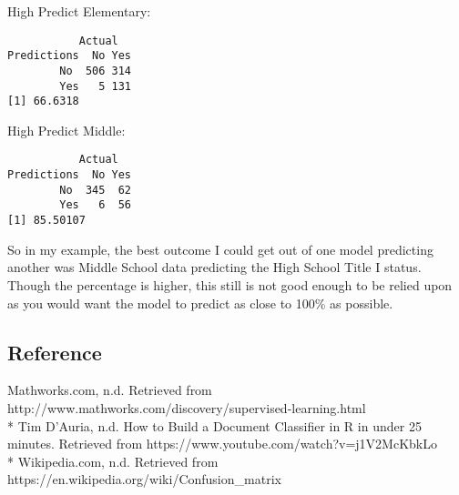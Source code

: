 \documentclass[10pt]{article}
\begin{document}
\begin{multicols}{2}
High Predict Elementary:
\begin{verbatim}
           Actual
Predictions  No Yes
        No  506 314
        Yes   5 131
[1] 66.6318
\end{verbatim}
High Predict Middle:
\begin{verbatim}
           Actual
Predictions  No Yes
        No  345  62
        Yes   6  56
[1] 85.50107
\end{verbatim}
\end{multicols}
So in my example, the best outcome I could get out of one model predicting another was Middle School data predicting the High School Title I status. Though the percentage is higher, this still is not good enough to be relied upon as you would want the model to predict as close to 100\% as possible. 

\subsection*{Reference}
Mathworks.com, n.d. Retrieved from http://www.mathworks.com/discovery/supervised-learning.html\\*
Tim D'Auria, n.d. How to Build a Document Classifier in R in under 25 minutes. Retrieved from https://www.youtube.com/watch?v=j1V2McKbkLo\\*
Wikipedia.com, n.d. 
Retrieved from https://en.wikipedia.org/wiki/Confusion\_matrix 
\end{document}
